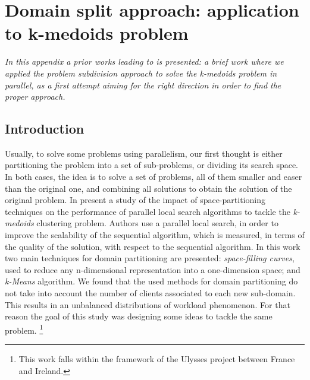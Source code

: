 \chapter{Domain split approach: application to k-medoids problem}
\label{chap:prior_split}
\textit{In this appendix a prior works leading to \posl{} is presented: a brief work where we applied the {\it problem subdivision} approach to solve the {\it k-medoids problem} in parallel, as a first attempt aiming for the right direction in order to find the proper approach.} 

\vspace{2ex}\vfill
\minitoc
\newpage

\section{Introduction}

Usually, to solve some problems using parallelism, our first thought is either partitioning the problem into a set of sub-problems, or dividing its search space. In both cases, the idea is to solve a set of problems, all of them smaller and easer than the original one, and combining all solutions to obtain the solution of the original problem. In \cite{Arbelaez2012}  present a study of the impact of space-partitioning techniques on the performance of parallel local search algorithms to tackle the \textit{k-medoids} clustering problem. Authors use a parallel local search, in order to improve the scalability of the sequential algorithm, which is measured, in terms of the quality of the solution, with respect to the sequential algorithm. In this work two main techniques for domain partitioning are presented: {\it space-filling curves}, used to reduce any n-dimensional representation into a one-dimension space; and {\it k-Means} algorithm. We found that the used methods for domain partitioning do not take into account the number of clients associated to each new sub-domain. This results in an unbalanced distributions of workload phenomenon. For that reason the goal of this study was designing some ideas to tackle the same problem. \footnote{This work falls within the framework of the Ulysses project between France and Ireland.}


